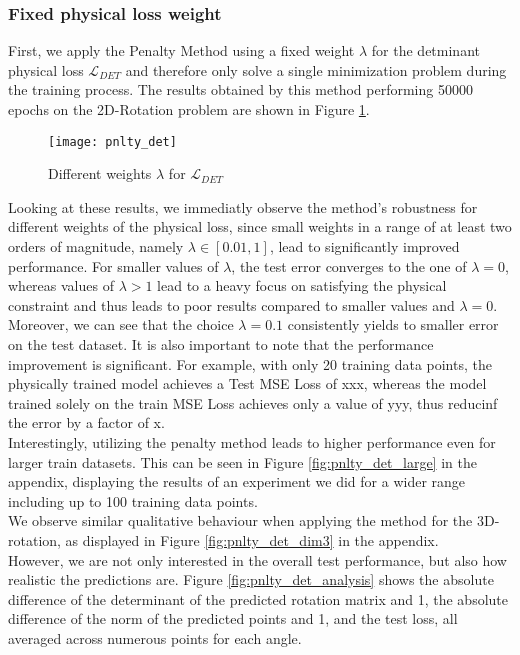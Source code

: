 \subsubsection{Fixed physical loss weight}
First, we apply the Penalty Method using a fixed weight $\lambda$ for the detminant physical loss $\mathcal{L}_{DET}$ and therefore only solve a single minimization problem during the training process. The results obtained by this method performing 50000 epochs on the 2D-Rotation problem are shown in Figure \ref{fig:pnlty_det}.

\begin{figure}[ht]
	\texttt{[image: pnlty\_det]}
	\caption{Different weights $\lambda$ for $\mathcal{L}_{DET}$}
	\label{fig:pnlty_det}
\end{figure}


Looking at these results, we immediatly observe the method's robustness for different weights of the physical loss, since small weights in a range of at least two orders of magnitude, namely $\lambda \in [0.01, 1]$, lead to significantly improved performance. For smaller values of $\lambda$, the test error converges to the one of $\lambda= 0$, whereas values of $\lambda > 1$ lead to a heavy focus on satisfying the physical constraint and thus leads to poor results compared to smaller values and $\lambda=0$.\\
\indent Moreover, we can see that the choice $\lambda = 0.1$ consistently yields to smaller error on the test dataset. It is also important to note that the performance improvement is significant. For example, with only 20 training data points, the physically trained model achieves a Test MSE Loss of xxx, whereas the model trained solely on the train MSE Loss achieves only a value of yyy, thus reducinf the error by a factor of x. \\
\indent Interestingly, utilizing the penalty method leads to higher performance even for larger train datasets. This can be seen in Figure \ref{fig:pnlty_det_large} in the appendix, displaying the results of an experiment we did for a wider range including up to 100 training data points.\\
We observe similar qualitative behaviour when applying the method for the 3D-rotation, as displayed in Figure \ref{fig:pnlty_det_dim3} in the appendix.\\
\indent However, we are not only interested in the overall test performance, but also how realistic the predictions are. Figure \ref{fig:pnlty_det_analysis} shows the absolute difference of the determinant of the predicted rotation matrix and 1, the absolute difference of the norm of the predicted points and 1, and the test loss, all averaged across numerous points for each angle.\\
